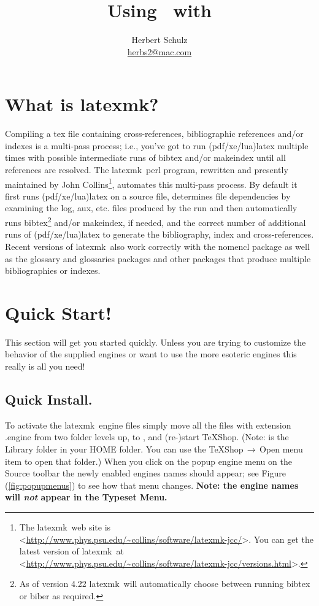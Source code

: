 \documentclass[11pt]{article}
\title{Using \latexmk\ with \TS}
\author{Herbert Schulz\\\small\href{mailto:herbs2@mac.com}{herbs2@mac.com}}
\date{}
\newcommand{\mnu}[1]{\textsf{#1}}
\newcommand{\cmd}[1]{\textsf{#1}}
\newcommand{\To}{\,\(\to\)\,}
\newcommand{\TS}{\textsf{\TeX Shop}}
\newcommand{\latexmk}{\textsf{latexmk}}
\begin{document}
\maketitle
\thispagestyle{empty}

\section{What is \latexmk?}

Compiling a \cmd{tex} file containing cross-references, bibliographic references and/or indexes is a multi-pass process; i.e., you've got to run \cmd{(pdf/xe/lua)latex} multiple times with possible intermediate runs of \cmd{bibtex} and/or \cmd{makeindex} until all references are resolved. The \latexmk\ \cmd{perl} program, rewritten and presently maintained by John Collins\footnote{The \latexmk\ web site is <\url{http://www.phys.psu.edu/~collins/software/latexmk-jcc/}>. You can get the latest version of \latexmk\ at <\url{http://www.phys.psu.edu/~collins/software/latexmk-jcc/versions.html}>.}, automates this multi-pass process. By default it first runs \cmd{(pdf/xe/lua)latex} on a source file, determines file dependencies by examining the \cmd{log}, \cmd{aux},  etc. files  produced by the run and then automatically runs \cmd{bibtex}\footnote{As of version 4.22 \latexmk\ will automatically choose between running \cmd{bibtex} or \cmd{biber} as required.} and/or \cmd{makeindex}, if needed, and the correct number of additional runs of \cmd{(pdf/xe/lua)latex} to generate the bibliography, index and cross-references. Recent versions of \latexmk\ also work correctly with the \cmd{nomencl} package as well as the  \cmd{glossary} and \cmd{glossaries} packages and other packages that produce multiple bibliographies or indexes.

\section{Quick Start!}

This section will get you started quickly. Unless you are trying to customize the behavior of the supplied engines or want to use the more esoteric engines this really is all you need!

\subsection{Quick Install.}

To activate the \latexmk\ \cmd{engine} files simply move all the files with extension \cmd{.engine} from  two folder levels up, to , and (re-)start \TS. (Note:  is the \cmd{Library} folder in your \cmd{HOME} folder. You can use the \mnu{TeXShop}\To\mnu{Open } menu item to open that folder.) When you click on the popup engine menu on the Source toolbar the newly enabled engines names should appear; see Figure (\ref{fig:popupmenus}) to see how that menu changes. \textbf{Note: the engine names will \emph{not} appear in the \mnu{Typeset} Menu.}
\end{document}
